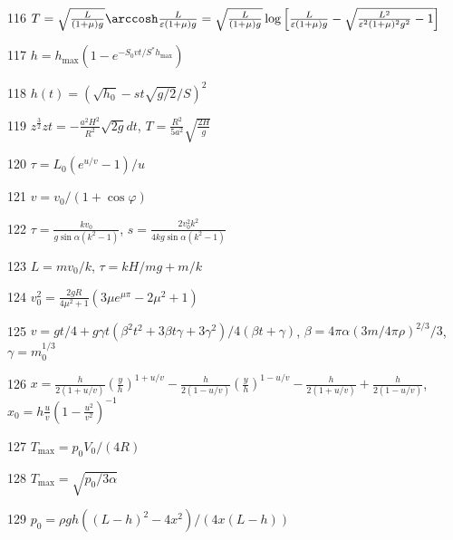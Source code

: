 \begin{Answer}{116}
$T = \sqrt{\frac{L}{(1+\mu) g}} \arccosh \frac{L}{\varepsilon (1+\mu)g} = \sqrt{\frac{L}{(1+\mu) g}} \log \left[ \frac{L}{\varepsilon (1+\mu) g} - \sqrt{\frac{L^2}{\varepsilon^2 (1+\mu)^2 g^2} - 1}\right]$
\end{Answer}
\begin{Answer}{117}
$h = h_{\max}(1-e^{-S_0vt/S^*h_{\max}})$
\end{Answer}
\begin{Answer}{118}
$h(t) = \left(\sqrt{h_0} - s t \sqrt{g/2} /S \right)^2$
\end{Answer}
\begin{Answer}{119}
$z^{\frac{3}{2}}zt = - \frac{a^2H^2}{R^2}\sqrt{2g}dt$, $T = \frac{R^2}{5a^2}\sqrt{\frac{2H}{g}}$
\end{Answer}
\begin{Answer}{120}
$\tau = L_0(e^{u/v} - 1)/u$
\end{Answer}
\begin{Answer}{121}
$v=v_0/(1+\cos \varphi)$
\end{Answer}
\begin{Answer}{122}
$\tau = \frac{kv_0}{g\sin\alpha(k^2-1)}$, $s = \frac{2v_0^2k^2}{4kg\sin\alpha(k^2-1)}$
\end{Answer}
\begin{Answer}{123}
$L = mv_0/k$, $\tau = kH/mg + m/k$
\end{Answer}
\begin{Answer}{124}
$v_0^2 = \frac{2gR}{4\mu^2+1}\left( 3\mu e^{\mu \pi} - 2\mu^2 +1\right)$
\end{Answer}
\begin{Answer}{125}
$v=gt/4+g\gamma t (\beta^2t^2+3\beta t \gamma+3\gamma^2)/4(\beta t + \gamma)$, $\beta = 4\pi \alpha(3m/4\pi\rho)^{2/3}/3$, $\gamma = m_0^{1/3}$
\end{Answer}
\begin{Answer}{126}
$x=\frac{h}{2(1+u/v)}(\frac{y}{h})^{1+u/v} - \frac{h}{2(1-u/v)}(\frac{y}{h})^{1-u/v} - \frac{h}{2(1+u/v)}+\frac{h}{2(1-u/v)}$, $x_0=h\frac{u}{v}\left(1-\frac{u^2}{v^2}\right)^{-1}$
\end{Answer}
\begin{Answer}{127}
$T_{\max}=p_0V_0/(4R)$
\end{Answer}
\begin{Answer}{128}
$T_{\max} = \sqrt{p_0/3\alpha}$
\end{Answer}
\begin{Answer}{129}
$p_0 = \rho g h \left( (L-h)^2 - 4x^2 \right)/ (4x(L-h))$
\end{Answer}
